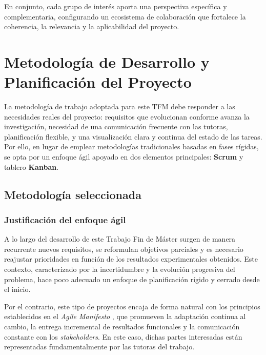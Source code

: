 \documentclass{report}
\begin{document}
En conjunto, cada grupo de interés aporta una perspectiva específica y complementaria, configurando un ecosistema de colaboración que fortalece la coherencia, la relevancia y la aplicabilidad del proyecto.

\chapter{Metodología de Desarrollo y Planificación del Proyecto}
\label{chap:metodologia}
La metodología de trabajo adoptada para este TFM debe responder a las necesidades reales del proyecto: requisitos que evolucionan conforme avanza la investigación, necesidad de una comunicación frecuente con las tutoras, planificación flexible, y una visualización clara y continua del estado de las tareas. Por ello, en lugar de emplear metodologías tradicionales basadas en fases rígidas, se opta por un enfoque ágil apoyado en dos elementos principales: \textbf{Scrum} y tablero \textbf{Kanban}.

\section{Metodología seleccionada}

\subsection{Justificación del enfoque ágil}

A lo largo del desarrollo de este Trabajo Fin de Máster surgen de manera recurrente nuevos requisitos, se reformulan objetivos parciales y es necesario reajustar prioridades en función de los resultados experimentales obtenidos. Este contexto, caracterizado por la incertidumbre y la evolución progresiva del problema, hace poco adecuado un enfoque de planificación rígido y cerrado desde el inicio.

Por el contrario, este tipo de proyectos encaja de forma natural con los principios establecidos en el \textit{Agile Manifesto} \cite{agileprinciples}, que promueven la adaptación continua al cambio, la entrega incremental de resultados funcionales y la comunicación constante con los \textit{stakeholders}. En este caso, dichas partes interesadas están representadas fundamentalmente por las tutoras del trabajo.
\end{document}
